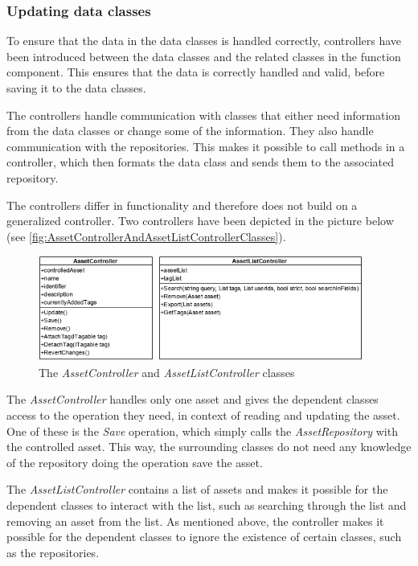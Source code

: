\subsubsection{Updating data classes}
To ensure that the data in the data classes is handled correctly, controllers have been introduced between the data classes and the related classes in the function component. This ensures that the data is correctly handled and valid, before saving it to the data classes.
\par
The controllers handle communication with classes that either need information from the data classes or change some of the information. They also handle communication with the repositories. This makes it possible to call methods in a controller, which then formats the data class and sends them to the associated repository.
\par
The controllers differ in functionality and therefore does not build on a generalized controller. Two controllers have been depicted in the picture below (see \autoref{fig:AssetControllerAndAssetListControllerClasses}).

\begin{figure}[H]
    \centering
    \includegraphics[width=0.95\textwidth]{figures/FunctionComponent/AssetControllerAndAssetListController.png}
    \caption{The \textit{AssetController} and \textit{AssetListController} classes}
    \label{fig:AssetControllerAndAssetListControllerClasses}
\end{figure}

The \textit{AssetController} handles only one asset and gives the dependent classes access to the operation they need, in context of reading and updating the asset. One of these is the \textit{Save} operation, which simply calls the \textit{AssetRepository} with the controlled asset. This way, the surrounding classes do not need any knowledge of the repository doing the operation  save the asset.
\par
The \textit{AssetListController} contains a list of assets and makes it possible for the dependent classes to interact with the list, such as searching through the list and removing an asset from the list. As mentioned above, the controller makes it possible for the dependent classes to ignore the existence of certain classes, such as the repositories.

